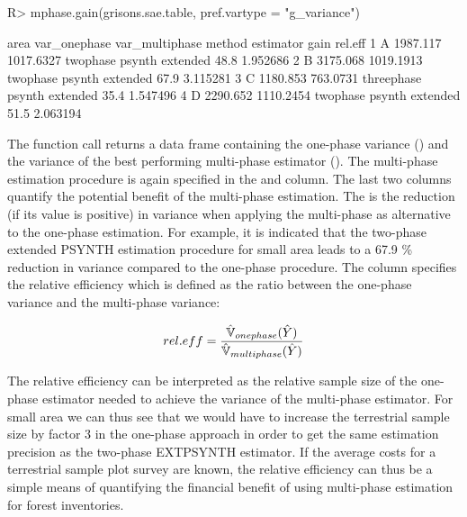 \begin{small}
\begin{Schunk}
\begin{Sinput}
R> mphase.gain(grisons.sae.table, pref.vartype = "g_variance")
\end{Sinput}
\begin{Soutput}
  area var_onephase var_multiphase     method       estimator gain  rel.eff
1    A     1987.117      1017.6327   twophase psynth extended 48.8 1.952686
2    B     3175.068      1019.1913   twophase psynth extended 67.9 3.115281
3    C     1180.853       763.0731 threephase psynth extended 35.4 1.547496
4    D     2290.652      1110.2454   twophase psynth extended 51.5 2.063194
\end{Soutput}
\end{Schunk}
\end{small}

The function call returns a data frame containing the one-phase variance () and the variance of the best performing multi-phase estimator (). The multi-phase estimation procedure is again specified in the  and  column. The last two columns quantify the potential benefit of the multi-phase estimation. The  is the reduction (if its value is positive) in variance when applying the multi-phase as alternative to the one-phase estimation. For example, it is indicated that the two-phase extended PSYNTH estimation procedure for small area  leads to a 67.9 \% reduction in variance compared to the one-phase procedure. The column  specifies the relative efficiency which is defined as the ratio between the one-phase variance and the multi-phase variance:

\begin{equation}\label{eq:releff}
  rel.eff=\frac{\hat{\mathbb{V}}_{onephase}(\hat{Y})}{\hat{\mathbb{V}}_{multiphase}(\hat{Y})}
  \end{equation}

The relative efficiency can be interpreted as the relative sample size of the one-phase estimator needed to achieve the variance of the multi-phase estimator. For small area  we can thus see that we would have to increase the terrestrial sample size by factor 3 in the one-phase approach in order to get the same estimation precision as the two-phase EXTPSYNTH estimator. If the average costs for a terrestrial sample plot survey are known, the relative efficiency can thus be a simple means of quantifying the financial benefit of using multi-phase estimation for forest inventories.


